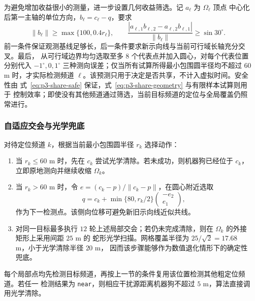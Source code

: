 为避免增加收益很小的测量，进一步设置几何收益筛选。记 $a_\ell$ 为 $\Omega_\ell$ 顶点
中心化后第一主轴的单位方向，$b_\ell=c_\ell-q$，要求
\begin{equation}
\|b_\ell\|\ge\max\{100,0.4r_\ell\},\qquad
\frac{|a_{\ell,1}b_{\ell,2}-a_{\ell,2}b_{\ell,1}|}{\|b_\ell\|}
\ge\sin30^\circ.
\label{eq:p3-share-geometry}
\end{equation}
前一条件保证观测基线足够长，后一条件要求新示向线与当前可行域长轴充分交叉。最后，
从可行域边界均匀选取至多 $8$ 个代表点并加入圆心，对每个代表位置分别代入
$-1^\circ,0,1^\circ$ 三种测向误差；仅当所有试算所得最小包围圆半径均不超过 $60$ m
时，才实际检测频道 $\ell$。该预测只用于决定是否共享，不计入虚拟时间。安全性由
式~\eqref{eq:p3-share-safe} 保证，式~\eqref{eq:p3-share-geometry} 与有限样本试算则用于
控制效率；即使没有其他频道通过筛选，当前目标频道的定位与全局覆盖仍照常进行。

\subsubsection{自适应交会与光学兜底}

对待定位频道 $k$，根据当前最小包围圆半径 $r_k$ 选择动作：
\begin{enumerate}
    \item 当 $r_k\le60$ m 时，先在 $c_k$ 尝试光学清除。若未成功，则机器狗已经位于
    $c_k$，立即原地测向并继续收缩 $\Omega_k$。
    \item 当 $r_k>60$ m 时，令 $e=(c_k-p)/\|c_k-p\|$，在圆心附近选取
    \begin{equation}
    q=c_k+\min\{80,r_k/2\}
    \begin{pmatrix}-e_2\\e_1\end{pmatrix},
    \label{eq:p3-side-step}
    \end{equation}
    作为下一检测点。该侧向位移可避免新旧示向线近似共线。
    \item 对同一目标最多执行 $12$ 轮上述局部交会；若仍未完成清除，则在
    $\Omega_k$ 的外接矩形上采用间距 $25$ m 的
    蛇形光学扫描。网格覆盖半径为 $25/\sqrt2=17.68$ m，小于光学清除半径 $20$ m，
    因而该步骤能够作为数值退化情形下的确定性兜底。
\end{enumerate}
每个局部点均先检测目标频道，再按上一节的条件复用该位置检测其他粗定位频道。若任一
检测结果为 \texttt{near}，则相应干扰源距离机器狗不超过 $5$ m，算法直接调用光学清除。


